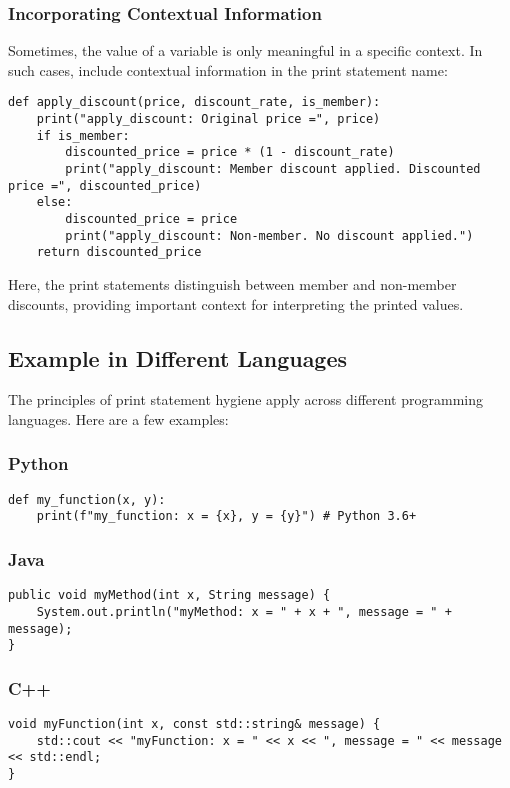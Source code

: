 \documentclass{article}
\begin{document}
{{{\subsubsection*{Incorporating Contextual Information}

Sometimes, the value of a variable is only meaningful in a specific context.  In such cases, include contextual information in the print statement name:

\begin{verbatim}
def apply_discount(price, discount_rate, is_member):
    print("apply_discount: Original price =", price)
    if is_member:
        discounted_price = price * (1 - discount_rate)
        print("apply_discount: Member discount applied. Discounted price =", discounted_price)
    else:
        discounted_price = price
        print("apply_discount: Non-member. No discount applied.")
    return discounted_price
\end{verbatim}

Here, the print statements distinguish between member and non-member discounts, providing important context for interpreting the printed values.

\subsection*{Example in Different Languages}

The principles of print statement hygiene apply across different programming languages. Here are a few examples:

\subsubsection*{Python}
\begin{verbatim}
def my_function(x, y):
    print(f"my_function: x = {x}, y = {y}") # Python 3.6+
\end{verbatim}

\subsubsection*{Java}
\begin{verbatim}
public void myMethod(int x, String message) {
    System.out.println("myMethod: x = " + x + ", message = " + message);
}
\end{verbatim}

\subsubsection*{C++}
\begin{verbatim}
void myFunction(int x, const std::string& message) {
    std::cout << "myFunction: x = " << x << ", message = " << message << std::endl;
}
\end{verbatim}

}}}
\end{document}
